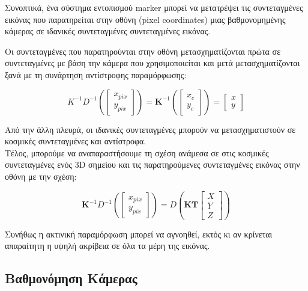 Συνοπτικά, ένα σύστημα εντοπισμού marker μπορεί να μετατρέψει τις συντεταγμένες εικόνας που παρατηρείται στην οθόνη (pixel coordinates) μιας βαθμονομημένης κάμερας σε ιδανικές συντεταγμένες συντεταγμένες εικόνας.


Οι συντεταγμένες που παρατηρούνται στην οθόνη μετασχηματίζονται πρώτα σε συντεταγμένες με βάση την κάμερα που χρησιμοποιείται και μετά μετασχηματίζονται ξανά με τη συνάρτηση αντίστροφης παραμόρφωσης:

\begin{equation}
K^{-1}D^{-1} 
\left (\begin{bmatrix}
x_{pix}\\ 
y_{pix}
\end{bmatrix}  \right )
=\mathbf{K}^{-1}
\left (\begin{bmatrix}
x_{c}\\ 
y_{c}
\end{bmatrix}  \right )
=
\begin{bmatrix}
x\\ 
y
\end{bmatrix}
\end{equation}

Από την άλλη πλευρά, οι ιδανικές συντεταγμένες μπορούν να μετασχηματιστούν σε κοσμικές συντεταγμένες και αντίστροφα.
\\Τέλος, μπορούμε να αναπαραστήσουμε τη σχέση ανάμεσα σε στις κοσμικές συντεταγμένες ενός 3D σημείου και τις παρατηρούμενες συντεταγμένες εικόνας στην οθόνη με την σχέση:

\begin{equation}
\mathbf{K}^{-1}D^{-1} 
\left (\begin{bmatrix}
x_{pix}\\ 
y_{pix}
\end{bmatrix}  \right )
=D
\left (\mathbf{KT} \begin{bmatrix}
X\\ 
Y\\
Z
\end{bmatrix}  \right )
\end{equation}


Συνήθως η ακτινική παραμόρφωση μπορεί να αγνοηθεί, εκτός κι αν κρίνεται απαραίτητη η υψηλή ακρίβεια σε όλα τα μέρη της εικόνας. 





\subsection{Βαθμονόμηση Κάμερας}



